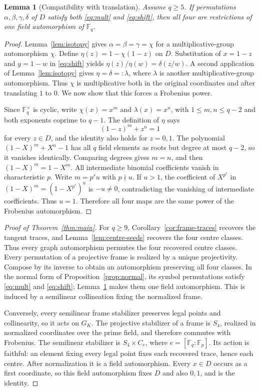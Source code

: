 \documentclass[11pt]{article}
\newtheorem{lemma}[theorem]{Lemma}
\theoremstyle{definition}
\theoremstyle{remark}
\newcommand{\F}{\mathbb F}
\begin{document}
\begin{lemma}[Compatibility with translation]\label{lem:frobenius}
Assume $q\ge5$. If permutations $\alpha,\beta,\gamma,\delta$ of $D$ satisfy both
\eqref{eq:mult} and \eqref{eq:shift}, then all four are restrictions of one
field automorphism of $\F_q$.
\end{lemma}

\begin{proof}
Lemma~\ref{lem:isotopy} gives
$\alpha=\beta=\gamma=\chi$ for a multiplicative-group automorphism $\chi$.
Define $\eta(z)=1-\chi(1-z)$ on $D$.  Substitution of $x=1-z$ and $y=1-w$
in \eqref{eq:shift} yields $\eta(z)/\eta(w)=\delta(z/w)$.  A second
application of Lemma~\ref{lem:isotopy} gives $\eta=\delta=:\lambda$, where
$\lambda$ is another multiplicative-group automorphism. Thus $\chi$ is
multiplicative both in the original coordinates and after translating
$1$ to $0$. We now show that this forces a Frobenius power.

Since $\F_q^\times$ is cyclic, write $\chi(x)=x^m$ and $\lambda(x)=x^n$, with
$1\leq m,n\leq q-2$ and both exponents coprime to $q-1$.  The definition
of $\eta$ says
\[
 (1-z)^m+z^n=1
\]
for every $z\in D$, and the identity also holds for $z=0,1$.  The
polynomial $(1-X)^m+X^n-1$ has all $q$ field elements as roots but degree
at most $q-2$, so it vanishes identically.  Comparing degrees gives $m=n$,
and then $(1-X)^m=1-X^m$.  All intermediate binomial coefficients vanish
in characteristic $p$.  Write $m=p^r u$ with $p\nmid u$. If $u>1$, the coefficient of
$X^{p^r}$ in $(1-X)^m=(1-X^{p^r})^u$ is $-u\ne0$,
contradicting the vanishing of intermediate coefficients. Thus $u=1$.
Therefore all four maps are the same power of the Frobenius automorphism.
\end{proof}

\begin{proof}[Proof of Theorem~\ref{thm:main}]
For $q\ge9$, Corollary~\ref{cor:frame-traces} recovers the tangent traces,
and Lemma~\ref{lem:centre-seeds} recovers the four centre classes.  Thus every graph automorphism
permutes the four recovered centre classes.  Every permutation of a
projective frame is realized by a unique projectivity.  Compose by its
inverse to obtain an automorphism preserving all four classes.  In the
normal form of Proposition~\ref{prop:normal}, its symbol permutations
satisfy \eqref{eq:mult} and \eqref{eq:shift}; Lemma~\ref{lem:frobenius}
makes them one field automorphism.  This is induced by a semilinear
collineation fixing the normalized frame.

Conversely, every semilinear frame stabilizer preserves legal points and
collinearity, so it acts on $G_K$.  The projective stabilizer of a frame is
$S_4$, realized in normalized coordinates over the prime field, and
therefore commutes with Frobenius. The semilinear stabilizer is
$S_4\times C_e$, where $e=[\F_q:\F_p]$.
Its action is faithful: an element fixing every legal point fixes each
recovered trace, hence each centre. After normalization it is a field
automorphism. Every $x\in D$ occurs as a first coordinate, so this
field automorphism fixes $D$ and also $0,1$, and is the identity.
\end{proof}
\end{document}
